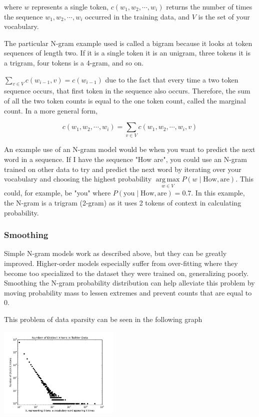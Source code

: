 \documentclass[11pt]{article}
\DeclareMathOperator*{\argmax}{arg\,max}
\begin{document}
where $w$ represents a single token, $c \left( w_1, w_2, \cdots, w_i \right)$ returns the number of times the sequence $w_1, w_2, \cdots, w_i$ occurred in the training data, and $V$ is the set of your vocabulary.

The particular N-gram example used is called a bigram because it looks at token sequences of length two. If it is a single token it is an unigram, three tokens it is a trigram, four tokens is a 4-gram, and so on.

$\sum\limits_{v \in V} c\left( w_{i-1}, v \right) = c\left( w_{i-1}\right)$ due to the fact that every time a two token sequence occurs, that first token in the sequence also occurs. Therefore, the sum of all the two token counts is equal to the one token count, called the marginal count. In a more general form,

$$ c\left(w_1, w_2, \cdots, w_i\right) =  \sum\limits_{v \in V} c\left(w_1, w_2, \cdots, w_i, v\right) $$

An example use of an N-gram model would be when you want to predict the next word in a sequence. If I have the sequence "How are", you could use an N-gram trained on other data to try and predict the next word by iterating over your vocabulary and choosing the highest probability $\argmax\limits_{w \in V} P\left( w \; \vert \; \text{How}, \text{are} \right)$. This could, for example, be "you" where $P\left( \text{you} \; \vert \; \text{How}, \text{are} \right) = 0.7$. In this example, the N-gram is a trigram (2-gram) as it uses 2 tokens of context in calculating probability.

\subsubsection{Smoothing}

Simple N-gram models work as described above, but they can be greatly improved. Higher-order models especially suffer from over-fitting where they become too specialized to the dataset they were trained on, generalizing poorly. Smoothing the N-gram probability distribution can help alleviate this problem by moving probability mass to lessen extremes and prevent counts that are equal to 0.

This problem of data sparsity can be seen in the following graph

\includegraphics[width=218px]{graphs/x-ton.png}
\end{document}
